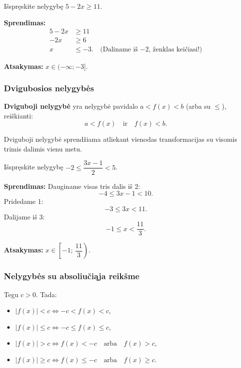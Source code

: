\begin{example}
Išspręskite nelygybę $5 - 2x \geq 11$.

\textbf{Sprendimas:}
\begin{align*}
    5 - 2x &\geq 11 \\
    -2x &\geq 6 \\
    x &\leq -3. \quad \text{(Daliname iš $-2$, ženklas keičiasi!)}
\end{align*}

\textbf{Atsakymas:} $x \in (-\infty; -3]$.
\end{example}

\subsubsection{Dvigubosios nelygybės}

\begin{definition}
\textbf{Dviguboji nelygybė} yra nelygybė pavidalo $a < f(x) < b$ (arba su $\leq$), reiškianti:
\[
a < f(x) \quad \text{ir} \quad f(x) < b.
\]
\end{definition}

Dviguboji nelygybė sprendžiama atliekant vienodas transformacijas su visomis trimis dalimis vienu metu.

\begin{example}
Išspręskite nelygybę $-2 \leq \dfrac{3x - 1}{2} < 5$.

\textbf{Sprendimas:} Dauginame visas tris dalis iš 2:
\[
-4 \leq 3x - 1 < 10.
\]
Pridedame 1:
\[
-3 \leq 3x < 11.
\]
Dalijame iš 3:
\[
-1 \leq x < \frac{11}{3}.
\]

\textbf{Atsakymas:} $x \in \left[-1;\, \dfrac{11}{3}\right)$.
\end{example}

\subsubsection{Nelygybės su absoliučiąja reikšme}

\begin{tcolorbox}[title=Nelygybių su moduliu sprendimas, colback=blue!5, colframe=blue!50!black]
Tegu $c > 0$. Tada:
\begin{itemize}
    \item $|f(x)| < c \iff -c < f(x) < c$,
    \item $|f(x)| \leq c \iff -c \leq f(x) \leq c$,
    \item $|f(x)| > c \iff f(x) < -c \quad \text{arba} \quad f(x) > c$,
    \item $|f(x)| \geq c \iff f(x) \leq -c \quad \text{arba} \quad f(x) \geq c$.
\end{itemize}
\end{tcolorbox}

